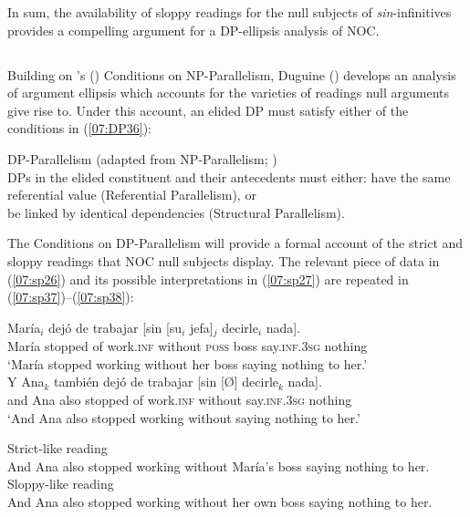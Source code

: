 \documentclass[output=paper,colorlinks,citecolor=brown,draft,draftmode]{langscibook}
\begin{document}
In sum, the availability of sloppy readings for the null subjects of \textit{sin}-infinitives provides a compelling argument for a DP-ellipsis analysis of NOC.

\subsection{}
Building on \citeauthor{fox00}'s (\citeyear{fox00}) Conditions on NP-Parallelism, Duguine (\citeyear{duguine13, duguine14}) develops an analysis of argument ellipsis which accounts for the varieties of readings null arguments give rise to. Under this account, an elided DP must satisfy either of the conditions in (\ref{07:DP36}):

\ea \label{07:DP36}
{DP-Parallelism} (adapted from NP-Parallelism; \citealt[117]{fox00})\\
DPs in the elided constituent and their antecedents must either:
\ea have the same referential value (Referential Parallelism), or\\
\ex be linked by identical dependencies  (Structural Parallelism).\\
\z
\z

The Conditions on DP-Parallelism will provide a formal account of the strict and sloppy readings that NOC null subjects display. The relevant piece of data in (\ref{07:sp26}) and its possible interpretations in (\ref{07:sp27}) are repeated in (\ref{07:sp37})--(\ref{07:sp38}):


\begin{exe}
\ex\label{07:sp37}
\begin{xlista}
\ex
\gll\label{07:sp37A}María$_i$ dejó de trabajar [sin [su$_i$ jefa]$_j$ decirle$_i$ nada].\\
María stopped of work.\textsc{inf} without \textsc{poss} boss say.\textsc{inf}.\textsc{3sg} nothing\\
\glt ‘María stopped working without her boss saying nothing to her.’\\
\ex
\gll\label{07:sp37B}Y Ana$_k$ también dejó de trabajar [sin [Ø] decirle$_k$ nada].\\
and Ana also stopped of work.\textsc{inf} without  {} say.\textsc{inf}.\textsc{3sg} nothing\\
\glt ‘And Ana also stopped working without saying nothing to her.’
\end{xlista}
\end{exe}


\ea\label{07:sp38}
\ea\label{07:sp38a}\cmark Strict-like reading\\
And Ana also stopped working without María’s boss saying nothing to her.\\
\ex\label{07:sp38b}\cmark Sloppy-like reading\\
And Ana also stopped working without her own boss saying nothing to her.
\z
 \z
\end{document}
